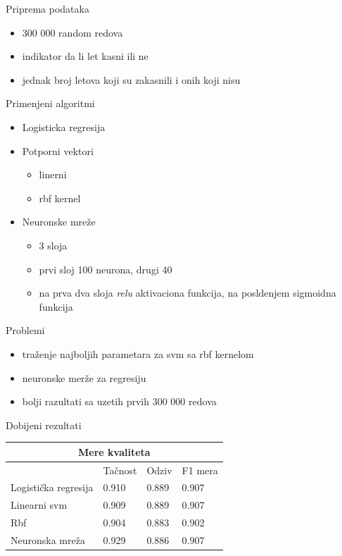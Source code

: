 \documentclass{beamer}
\begin{document}
\begin{frame}{Priprema podataka}
    \begin{itemize}
        \item 300 000 random redova
        \item indikator da li let kasni ili ne
        \item jednak broj letova koji su zakasnili i onih koji nisu
    \end{itemize}
\end{frame}

\begin{frame}{Primenjeni algoritmi}
    \begin{itemize}
        \item Logisticka regresija
        \item Potporni vektori
        \begin{itemize}
        	\item linerni
        	\item rbf kernel
        \end{itemize}
        \item Neuronske mreže
        \begin{itemize}
        	\item 3 sloja
        	\item prvi sloj 100 neurona, drugi 40
        	\item na prva dva sloja \emph{relu} aktivaciona funkcija, na posldenjem sigmoidna funkcija
        \end{itemize}
    \end{itemize}
\end{frame}

\begin{frame}{Problemi}
    \begin{itemize}
        \item traženje najboljih parametara za svm sa rbf kernelom
        \item neuronske merže za regresiju
        \item bolji razultati sa uzetih prvih 300 000 redova
    \end{itemize}
\end{frame}

\begin{frame}{Dobijeni rezultati}

\begin{tabular}{ |p{2cm}||p{2cm}|p{2cm}|p{2cm}|  }
 \hline
 \multicolumn{4}{|c|}{Mere kvaliteta} \\
 \hline
  & Tačnost &Odziv&F1 mera\\
 \hline
 Logistička regresija& 0.910    &0.889&  0.907\\
 Linearni svm&   0.909  & 0.889   &0.907\\
 Rbf  & 0.904& 0.883&  0.902\\
 Neuronska mreža    &0.929 & 0.886&  0.907\\
 \hline
\end{tabular}

\end{frame}
\end{document}
